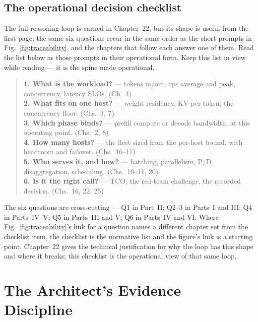 \subsection*{The operational decision checklist}

The full reasoning loop is earned in Chapter~22, but its shape is useful from
the first page: the same six questions recur in the same order as the short
prompts in Fig.~\ref{fig:traceability}, and the chapters that follow each
answer one of them. Read the list below as those prompts in their operational
form. Keep this list in view while
reading --- it is the spine made operational.

\begin{quote}
\textbf{1. What is the workload?} --- tokens in/out, rps average and peak,
concurrency, latency SLOs. (Ch.~4)\\
\textbf{2. What fits on one host?} --- weight residency, KV per token, the
concurrency floor. (Chs.~3, 7)\\
\textbf{3. Which phase binds?} --- prefill compute or decode bandwidth, at this
operating point. (Chs.~2, 8)\\
\textbf{4. How many hosts?} --- the fleet sized from the per-host bound, with
headroom and failover. (Chs.~16--17)\\
\textbf{5. Who serves it, and how?} --- batching, parallelism, P/D
disaggregation, scheduling. (Chs.~10--11, 20)\\
\textbf{6. Is it the right call?} --- TCO, the red-team challenge, the recorded
decision. (Chs.~16, 22, 25)
\end{quote}

The six questions are cross-cutting --- Q1 in Part~II; Q2--3 in Parts~I and
III; Q4 in Parts~IV--V; Q5 in Parts~III and V; Q6 in Parts~IV and VI. Where
Fig.~\ref{fig:traceability}'s link for a question names a different chapter
set from the checklist item, the checklist is the normative list and the
figure's link is a starting point. Chapter~22 gives the technical
justification for why the loop has this shape and where it breaks; this
checklist is the operational view of that same loop.

\section*{The Architect's Evidence Discipline}

